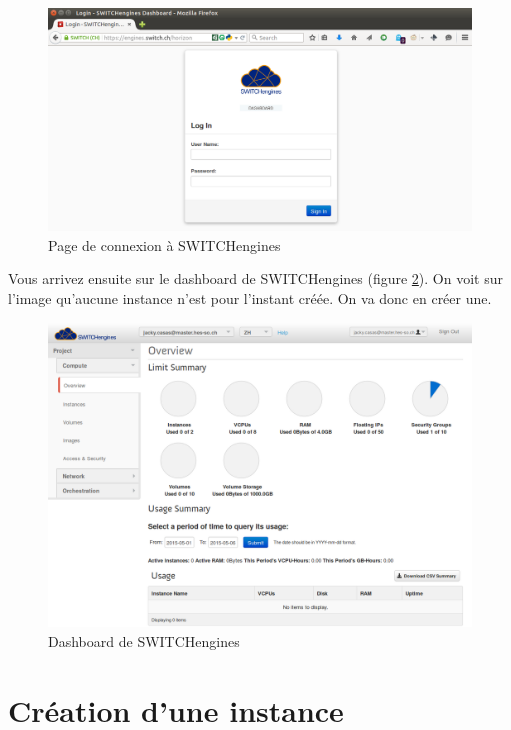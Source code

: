 \begin{figure}[h]
  \centering
    \includegraphics[width=\linewidth]{img/engines1.png}
  \caption{Page de connexion à SWITCHengines}
  \label{loginSWITCHengines}
\end{figure}

Vous arrivez ensuite sur le dashboard de SWITCHengines (figure \ref{dashboard1}). On voit sur l'image qu'aucune instance n'est pour l'instant créée. On va donc en créer une. 

\begin{figure}[h]
  \centering
    \includegraphics[width=\linewidth]{img/dashboard1.png}
  \caption{Dashboard de SWITCHengines}
  \label{dashboard1}
\end{figure}

\clearpage


\section{Création d'une instance}

